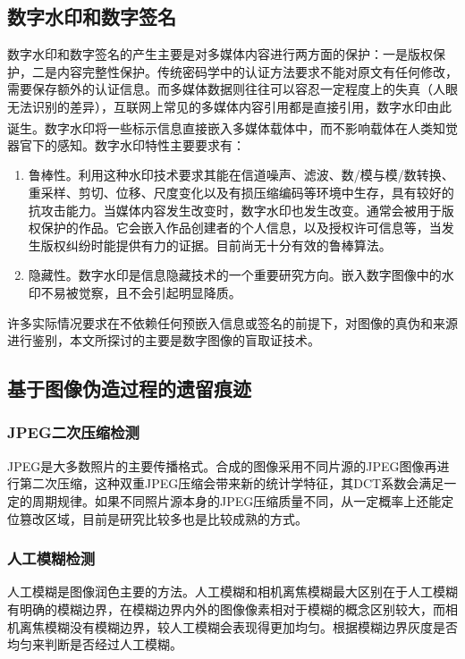 \documentclass[a4paper, 10pt, notitlepage]{report}
\newcommand{\supercite}[1]{\textsuperscript{\cite{#1}}}
\begin{document}
		\subsection{数字水印和数字签名}
			数字水印和数字签名的产生主要是对多媒体内容进行两方面的保护：一是版权保护，二是内容完整性保护。传统密码学中的认证方法要求不能对原文有任何修改，需要保存额外的认证信息。而多媒体数据则往往可以容忍一定程度上的失真（人眼无法识别的差异），互联网上常见的多媒体内容引用都是直接引用，数字水印由此诞生\supercite{forgerydetect01, 孙圣和2004数字水印技术及应用, 杨义先2006数字水印理论与技术}。数字水印将一些标示信息直接嵌入多媒体载体中，而不影响载体在人类知觉器官下的感知。数字水印特性主要要求有：
			\begin{enumerate}\setlength{\itemsep}{-0.1cm}
				\item 鲁棒性。利用这种水印技术要求其能在信道噪声、滤波、数/模与模/数转换、重采样、剪切、位移、尺度变化以及有损压缩编码等环境中生存，具有较好的抗攻击能力。当媒体内容发生改变时，数字水印也发生改变。通常会被用于版权保护的作品。它会嵌入作品创建者的个人信息，以及授权许可信息等，当发生版权纠纷时能提供有力的证据。目前尚无十分有效的鲁棒算法。
				\item 隐藏性。数字水印是信息隐藏技术的一个重要研究方向。嵌入数字图像中的水印不易被觉察，且不会引起明显降质。
			\end{enumerate}
			许多实际情况要求在不依赖任何预嵌入信息或签名的前提下，对图像的真伪和来源进行鉴别，本文所探讨的主要是数字图像的盲取证技术。

		\subsection{基于图像伪造过程的遗留痕迹}
			
			\subsubsection{JPEG二次压缩检测}
				JPEG是大多数照片的主要传播格式。合成的图像采用不同片源的JPEG图像再进行第二次压缩，这种双重JPEG压缩会带来新的统计学特征，其DCT系数会满足一定的周期规律。如果不同照片源本身的JPEG压缩质量不同，从一定概率上还能定位篡改区域，目前是研究比较多也是比较成熟的方式。

			\subsubsection{人工模糊检测}
				人工模糊是图像润色主要的方法。人工模糊和相机离焦模糊最大区别在于人工模糊有明确的模糊边界，在模糊边界内外的图像像素相对于模糊的概念区别较大，而相机离焦模糊没有模糊边界，较人工模糊会表现得更加均匀。根据模糊边界灰度是否均匀来判断是否经过人工模糊。
\end{document}
